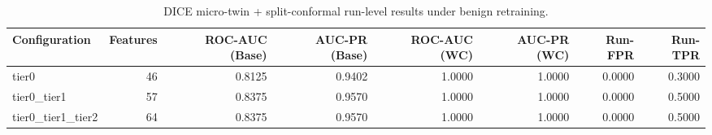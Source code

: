 \begin{table}[t]
\centering
\caption{DICE micro-twin + split-conformal run-level results under benign retraining.}
\label{tab:dice_full_overall}
\footnotesize
\begin{tabular}{lrrrrrrr}
\toprule
Configuration & Features & ROC-AUC (Base) & AUC-PR (Base) & ROC-AUC (WC) & AUC-PR (WC) & Run-FPR & Run-TPR \\
\midrule
tier0 & 46 & 0.8125 & 0.9402 & 1.0000 & 1.0000 & 0.0000 & 0.3000 \\
tier0_tier1 & 57 & 0.8375 & 0.9570 & 1.0000 & 1.0000 & 0.0000 & 0.5000 \\
tier0_tier1_tier2 & 64 & 0.8375 & 0.9570 & 1.0000 & 1.0000 & 0.0000 & 0.5000 \\
\bottomrule
\end{tabular}

\end{table}
